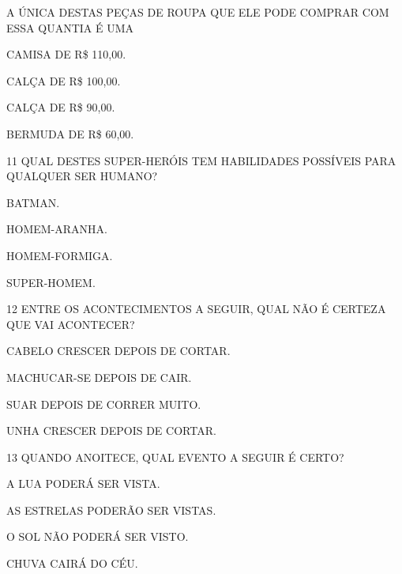 A ÚNICA DESTAS PEÇAS DE ROUPA QUE ELE PODE COMPRAR COM ESSA QUANTIA É UMA

\begin{escolha}
\item CAMISA DE R\$ 110,00.

\item CALÇA DE R\$ 100,00.

\item CALÇA DE R\$ 90,00.

\item BERMUDA DE R\$ 60,00.
\end{escolha}

\num{11} QUAL DESTES SUPER-HERÓIS TEM HABILIDADES POSSÍVEIS PARA QUALQUER SER HUMANO?

\begin{multicols}{2}
\begin{escolha}
\item BATMAN.

\item HOMEM-ARANHA.

\item HOMEM-FORMIGA.

\item SUPER-HOMEM.
\end{escolha}
\end{multicols}


\num{12} ENTRE OS ACONTECIMENTOS A SEGUIR, QUAL NÃO É CERTEZA QUE VAI
ACONTECER?

\begin{escolha}[itemsep=-5pt]
\item CABELO CRESCER DEPOIS DE CORTAR.

\item MACHUCAR-SE DEPOIS DE CAIR.

\item SUAR DEPOIS DE CORRER MUITO.

\item UNHA CRESCER DEPOIS DE CORTAR.
\end{escolha}

\num{13} QUANDO ANOITECE, QUAL EVENTO A SEGUIR É CERTO?

\begin{escolha}[itemsep=-5pt]
\item A LUA PODERÁ SER VISTA.

\item AS ESTRELAS PODERÃO SER VISTAS.

\item O SOL NÃO PODERÁ SER VISTO.

\item CHUVA CAIRÁ DO CÉU.
\end{escolha}


